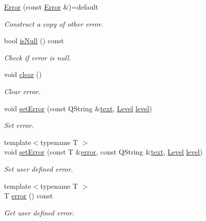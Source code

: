 \begin{DoxyCompactItemize}
\hyperlink{class_mdt_1_1_error_a7d7baf19eba7c6f5fb446a919fe8ee41}{Error} (const \hyperlink{class_mdt_1_1_error}{Error} \&)=default
\begin{DoxyCompactList}\small\item\em Construct a copy of other error. \end{DoxyCompactList}\item 
bool \hyperlink{class_mdt_1_1_error_a2b6a7708216d0de056c7d9e7dc571e70}{is\+Null} () const 
\begin{DoxyCompactList}\small\item\em Check if error is null. \end{DoxyCompactList}\item 
void \hyperlink{class_mdt_1_1_error_a77014ce33160e1f01b3fbb3e55f19783}{clear} ()
\begin{DoxyCompactList}\small\item\em Clear error. \end{DoxyCompactList}\item 
void \hyperlink{class_mdt_1_1_error_a895930ac30664f54a7f22ae593db53a0}{set\+Error} (const Q\+String \&\hyperlink{class_mdt_1_1_error_a99327678615e8f2bddd22cd59482bfc2}{text}, \hyperlink{class_mdt_1_1_error_ab533dc690f68a8635232db594194a068}{Level} \hyperlink{class_mdt_1_1_error_a9c73117a49791ab87163b815d6a3e0c9}{level})
\begin{DoxyCompactList}\small\item\em Set error. \end{DoxyCompactList}\item 
{\footnotesize template$<$typename T $>$ }\\void \hyperlink{class_mdt_1_1_error_a3f6e9656170e35c5a198bf05ccec9cd1}{set\+Error} (const T \&\hyperlink{class_mdt_1_1_error_a0d042250a76d0351b8c19367572f5e11}{error}, const Q\+String \&\hyperlink{class_mdt_1_1_error_a99327678615e8f2bddd22cd59482bfc2}{text}, \hyperlink{class_mdt_1_1_error_ab533dc690f68a8635232db594194a068}{Level} \hyperlink{class_mdt_1_1_error_a9c73117a49791ab87163b815d6a3e0c9}{level})
\begin{DoxyCompactList}\small\item\em Set user defined error. \end{DoxyCompactList}\item 
{\footnotesize template$<$typename T $>$ }\\T \hyperlink{class_mdt_1_1_error_a0d042250a76d0351b8c19367572f5e11}{error} () const 
\begin{DoxyCompactList}\small\item\em Get user defined error. \end{DoxyCompactList}\item 

\end{DoxyCompactItemize}
